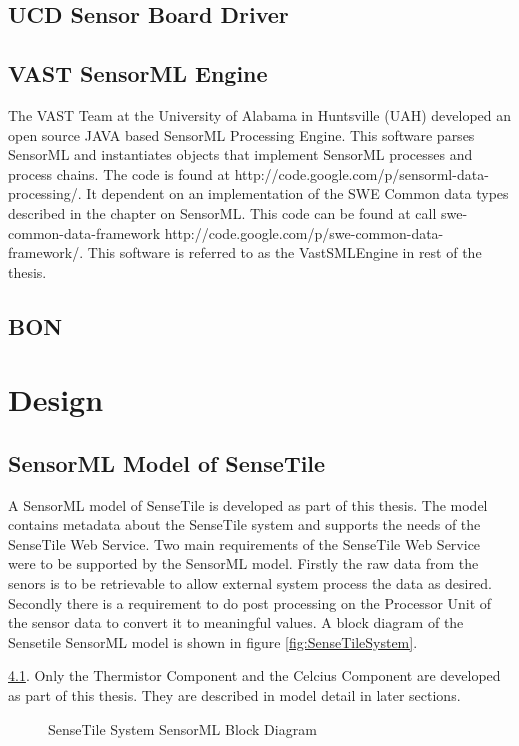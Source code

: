 \documentclass[]{final_report}
\begin{document}
\section{UCD Sensor Board Driver}


\section{VAST SensorML Engine}
The VAST Team at the University of Alabama in Huntsville (UAH)  developed an open source JAVA based SensorML Processing Engine. This software parses SensorML and instantiates objects that implement SensorML processes and process  chains. The code is found at http://code.google.com/p/sensorml-data-processing/. It dependent on an implementation of the SWE Common data types described in the chapter on SensorML. This code can be found at call swe-common-data-framework http://code.google.com/p/swe-common-data-framework/. This software is referred to as the VastSMLEngine in rest of the thesis.


\section{BON}


\chapter{Design}
\section{SensorML Model of SenseTile}

A SensorML model of SenseTile is developed as part of this thesis. The model contains metadata about the SenseTile system and supports the needs of the SenseTile Web Service. Two main requirements of the SenseTile Web Service were to be supported by the SensorML model. Firstly the raw data from the senors is to be retrievable to allow external system process the data as desired. Secondly there is a requirement to do post processing on the Processor Unit of the sensor data to convert it to meaningful values. A block diagram of the Sensetile SensorML model is shown in figure \ref{fig:SenseTileSystem}.

\ref{fig:SensorML_SenseTile_System_comp}. Only the Thermistor Component and the Celcius Component are developed as part of this thesis. They are described in model detail in later sections.
\begin{figure}[h]
\caption{SenseTile System SensorML Block Diagram}\label{fig:SensorML_SenseTile_System_comp}
\end{figure}
\end{document}
